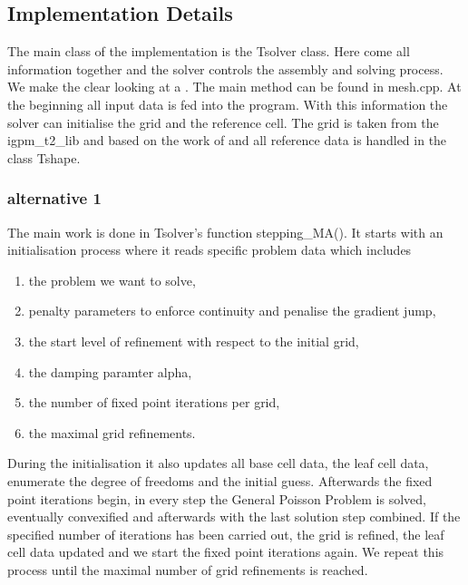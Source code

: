 
\subsection{Implementation Details}

The main class of the implementation is the Tsolver class. Here come all information together and the solver controls the assembly and solving process. 
We make the clear looking at a . The main method can be found in mesh.cpp. At the beginning all input data is fed into the program. With this information the solver can initialise the grid and the reference cell. 
The grid is taken from the igpm\_t2\_lib and based on the work of \cite{BMV2009} and all reference data is handled in the class Tshape.

\subsubsection{alternative 1}
The main work is done in Tsolver's function stepping\_MA(). It starts with an initialisation process where it reads specific problem data which includes
\begin{enumerate}
 \item  the problem we want to solve,
 \item penalty parameters to enforce continuity and penalise the gradient jump,
 \item the start level of refinement with respect to the initial grid,
 \item the damping paramter alpha,
 \item the number of fixed point iterations per grid,
 \item the maximal grid refinements.
\end{enumerate}
During the initialisation it also updates all base cell data, the leaf cell data, enumerate the degree of freedoms and the initial guess.
Afterwards the fixed point iterations begin, in every step the General Poisson Problem is solved, eventually convexified and afterwards with the last solution step combined. If the specified number of iterations has been carried out, the grid is refined, the leaf cell data updated and we start the fixed point iterations again.
We repeat this process until the maximal number of grid refinements is reached.



